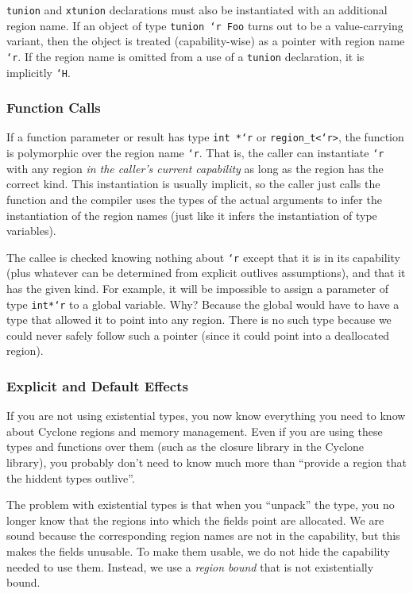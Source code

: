 \texttt{tunion} and \texttt{xtunion} declarations must also be
instantiated with an additional region name.  If an object of type
\texttt{tunion `r Foo} turns out to be a value-carrying variant, then
the object is treated (capability-wise) as a pointer with region name
\texttt{`r}.  If the region name is omitted from a use of a
\texttt{tunion} declaration, it is implicitly \texttt{`H}.

\subsubsection{Function Calls}

If a function parameter or result has type \texttt{int *`r} or
\texttt{region_t<`r>}, the function is polymorphic over the region name
\texttt{`r}.  That is, the caller can instantiate \texttt{`r} with any
region \emph{in the caller's current capability} as long as the region has
the correct kind. This instantiation is usually implicit, so the caller just
calls the function and the compiler uses the types of the actual arguments
to infer the instantiation of the region names (just like it infers the
instantiation of type variables).

The callee is checked knowing nothing about \texttt{`r} except that it is in
its capability (plus whatever can be determined from explicit outlives
assumptions), and that it has the given kind.  For example, it will be
impossible to assign a parameter of type \texttt{int*`r} to a global
variable.  Why?  Because the global would have to have a type that allowed
it to point into any region.  There is no such type because we could never
safely follow such a pointer (since it could point into a deallocated
region).

\subsubsection{Explicit and Default Effects}

If you are not using existential types, you now know everything you
need to know about Cyclone regions and memory management.  Even if you
are using these types and functions over them (such as the closure
library in the Cyclone library), you probably don't need to know much more
than ``provide a region that the hiddent types outlive''.

The problem with existential types is that when you ``unpack'' the
type, you no longer know that the regions into which the fields point
are allocated.  We are sound because the corresponding region names
are not in the capability, but this makes the fields unusable.  To
make them usable, we do not hide the capability needed to use them.
Instead, we use a \emph{region bound} that is not existentially
bound.  


